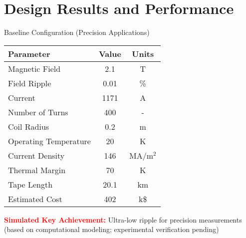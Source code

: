 \documentclass[aspectratio=169,xcolor={table,dvipsnames}]{beamer}
\newcommand{\highlight}[1]{\textcolor{red}{\textbf{#1}}}
\begin{document}
\section{Design Results and Performance}

\begin{frame}{Baseline Configuration (Precision Applications)}
    \begin{table}[h]
        \centering
        \begin{tabular}{lcc}
            \toprule
            \textbf{Parameter} & \textbf{Value} & \textbf{Units} \\
            \midrule
            Magnetic Field & 2.1 & T \\
            Field Ripple & 0.01 & \% \\
            Current & 1171 & A \\
            Number of Turns & 400 & - \\
            Coil Radius & 0.2 & m \\
            Operating Temperature & 20 & K \\
            Current Density & 146 & MA/m$^2$ \\
            Thermal Margin & 70 & K \\
            Tape Length & 20.1 & km \\
            Estimated Cost & 402 & k\$ \\
            \bottomrule
        \end{tabular}
    \end{table}
    
    \highlight{Simulated Key Achievement:} Ultra-low ripple for precision measurements (based on computational modeling; experimental verification pending)
\end{frame}
\end{document}
